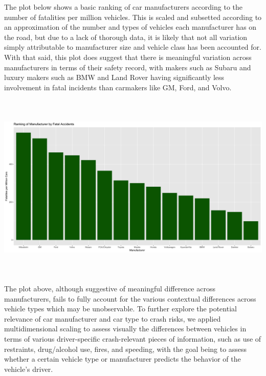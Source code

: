 \documentclass[11pt, oneside,titlepage]{article}   	%
\begin{document}
The plot below shows a basic ranking of car manufacturers according to the number of fatalities per million vehicles. This is scaled and subsetted according to an approximation of the number and types of vehicles each manufacturer has on the road, but due to a lack of thorough data, it is likely that not all variation simply attributable to manufacturer size and vehicle class has been accounted for. With that said, this plot does suggest that there is meaningful variation across manufacturers in terms of their safety record, with makers such as Subaru and luxury makers such as BMW and Land Rover having significantly less involvement in fatal incidents than carmakers like GM, Ford, and Volvo.
\\
\begin{center}
\includegraphics[width=.75\textwidth,height=9cm,keepaspectratio]{ManufacturerRankingPlot.png}
\end{center}

The plot above, although suggestive of meaningful difference across manufacturers, fails to fully account for the various contextual differences across vehicle types which may be unobservable. To further explore the potential relevance of car manufacturer and car type to crash risks, we applied multidimensional scaling to assess visually the differences between vehicles in terms of various driver-specific crash-relevant pieces of information, such as use of restraints, drug/alcohol use, fires, and speeding, with the goal being to assess whether a certain vehicle type or manufacturer predicts the behavior of the vehicle's driver.\\
\end{document}
